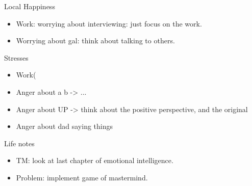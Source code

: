 \begin{frame}
  \begin{columns}
    \begin{column}{0.25\linewidth} %
      \begin{block}{Local Happiness}
        \begin{itemize}
          \tiny \item \tiny Work: worrying about interviewing: just focus on the work. 
        \item \tiny Worrying about gal: think about talking to others. 
        \end{itemize}
      \end{block}
      \begin{block}{Stresses}
        \begin{itemize}
          \tiny \item \tiny Work(
          \item \tiny Anger about a b  -> ...
          \item \tiny Anger about UP -> think about the positive
            perspective, and the original
          \item \tiny Anger about dad saying things 
        \end{itemize}
      \end{block}    
      \begin{block}{Life notes}
        \begin{itemize}
        \item \tiny TM: look at last chapter of emotional
          intelligence.  
        \item \tiny Problem: implement game of mastermind. 
        \end{itemize}
      \end{block}
    \end{column} %

    \begin{column}{0.50\linewidth}


\end{column}
\end{columns}
\end{frame}
